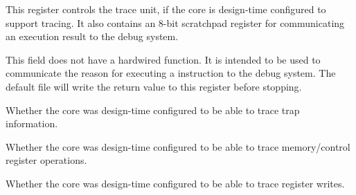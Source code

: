 \implementation{}


This register controls the trace unit, if the core is design-time configured to
support tracing. It also contains an 8-bit scratchpad register for communicating
an execution result to the debug system.

\signed{}
This field does not have a hardwired function. It is intended to be used to
communicate the reason for executing a  instruction to the debug
system. The default  file will write the  return
value to this register before stopping.

\implementation{}

\reset{*}
Whether the core was design-time configured to be able to trace trap
information.

\implementation{}

\reset{*}
Whether the core was design-time configured to be able to trace memory/control
register operations.

\implementation{}

\reset{*}
Whether the core was design-time configured to be able to trace register writes.

\implementation{}

